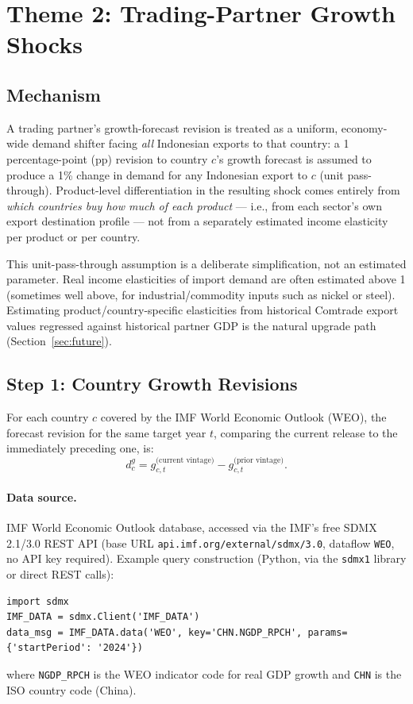\documentclass[11pt]{article}
\begin{document}
\section{Theme 2: Trading-Partner Growth Shocks}
\label{sec:theme2}

\subsection{Mechanism}

A trading partner's growth-forecast revision is treated as a uniform,
economy-wide demand shifter facing \emph{all} Indonesian exports to that
country: a 1 percentage-point (pp) revision to country $c$'s growth forecast
is assumed to produce a 1\% change in demand for any Indonesian export to
$c$ (unit pass-through). Product-level differentiation in the resulting
shock comes entirely from \emph{which countries buy how much of each
product} --- i.e., from each sector's own export destination profile --- not
from a separately estimated income elasticity per product or per country.

\begin{decisionbox}
This unit-pass-through assumption is a deliberate simplification, not an
estimated parameter. Real income elasticities of import demand are often
estimated above 1 (sometimes well above, for industrial/commodity inputs
such as nickel or steel). Estimating product/country-specific elasticities
from historical Comtrade export values regressed against historical partner
GDP is the natural upgrade path (Section~\ref{sec:future}).
\end{decisionbox}

\subsection{Step 1: Country Growth Revisions}

For each country $c$ covered by the IMF World Economic Outlook (WEO), the
forecast revision for the same target year $t$, comparing the current
release to the immediately preceding one, is:
\begin{equation}
  d^g_c = g_{c,t}^{\text{(current vintage)}} - g_{c,t}^{\text{(prior vintage)}}.
  \label{eq:theme2-dgc}
\end{equation}

\paragraph{Data source.} IMF World Economic Outlook database, accessed via
the IMF's free SDMX 2.1/3.0 REST API (base URL \texttt{api.imf.org/external/sdmx/3.0},
dataflow \texttt{WEO}, no API key required). Example query construction (Python,
via the \texttt{sdmx1} library or direct REST calls):
\begin{verbatim}
import sdmx
IMF_DATA = sdmx.Client('IMF_DATA')
data_msg = IMF_DATA.data('WEO', key='CHN.NGDP_RPCH', params={'startPeriod': '2024'})
\end{verbatim}
where \texttt{NGDP\_RPCH} is the WEO indicator code for real GDP growth and
\texttt{CHN} is the ISO country code (China).
\end{document}
